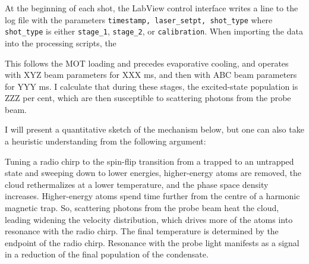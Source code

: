 
	At the beginning of each shot, the LabView control interface writes a line to the log file with the parameters \verb|timestamp, laser_setpt, shot_type| where \verb|shot_type| is either \verb|stage_1|, \verb|stage_2|, or \verb|calibration|.
	When importing the data into the processing scripts, the 



% 	
	This follows the MOT loading and precedes evaporative cooling, and operates with XYZ beam parameters for XXX ms, and then with ABC beam parameters for YYY ms.
	I calculate that during these stages, the excited-state population is ZZZ per cent, which are then susceptible to scattering photons from the probe beam.

	I will present a quantitative sketch of the mechanism below, but one can also take a heuristic understanding from the following argument:

	Tuning a radio chirp to the spin-flip transition from a trapped to an untrapped state and sweeping down to lower energies, higher-energy atoms are removed, the cloud rethermalizes at a lower temperature, and the phase space density increases.
	Higher-energy atoms spend time further from the centre of a harmonic magnetic trap.
	So, scattering photons from the probe beam heat the cloud, leading widening the velocity distribution, which drives more of the atoms into resonance with the radio chirp.
	The final temperature is determined by the endpoint of the radio chirp.
	Resonance with the probe light manifests as a signal in a reduction of the final population of the condensate.


